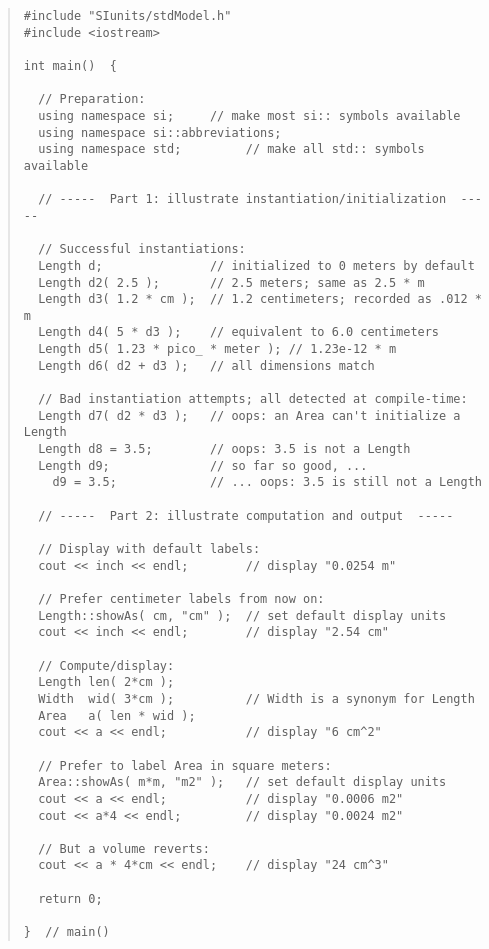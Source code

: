 \begin{quote}
\begin{verbatim}
#include "SIunits/stdModel.h"
#include <iostream>

int main()  {

  // Preparation:
  using namespace si;     // make most si:: symbols available
  using namespace si::abbreviations;
  using namespace std;         // make all std:: symbols available

  // -----  Part 1: illustrate instantiation/initialization  -----

  // Successful instantiations:
  Length d;               // initialized to 0 meters by default
  Length d2( 2.5 );       // 2.5 meters; same as 2.5 * m
  Length d3( 1.2 * cm );  // 1.2 centimeters; recorded as .012 * m
  Length d4( 5 * d3 );    // equivalent to 6.0 centimeters
  Length d5( 1.23 * pico_ * meter ); // 1.23e-12 * m
  Length d6( d2 + d3 );   // all dimensions match

  // Bad instantiation attempts; all detected at compile-time:
  Length d7( d2 * d3 );   // oops: an Area can't initialize a Length
  Length d8 = 3.5;        // oops: 3.5 is not a Length
  Length d9;              // so far so good, ...
    d9 = 3.5;             // ... oops: 3.5 is still not a Length

  // -----  Part 2: illustrate computation and output  -----

  // Display with default labels:
  cout << inch << endl;        // display "0.0254 m"

  // Prefer centimeter labels from now on:
  Length::showAs( cm, "cm" );  // set default display units
  cout << inch << endl;        // display "2.54 cm"

  // Compute/display:
  Length len( 2*cm );
  Width  wid( 3*cm );          // Width is a synonym for Length
  Area   a( len * wid );
  cout << a << endl;           // display "6 cm^2"

  // Prefer to label Area in square meters:
  Area::showAs( m*m, "m2" );   // set default display units
  cout << a << endl;           // display "0.0006 m2"
  cout << a*4 << endl;         // display "0.0024 m2"

  // But a volume reverts:
  cout << a * 4*cm << endl;    // display "24 cm^3"

  return 0;

}  // main()
\end{verbatim}
\end{quote}




